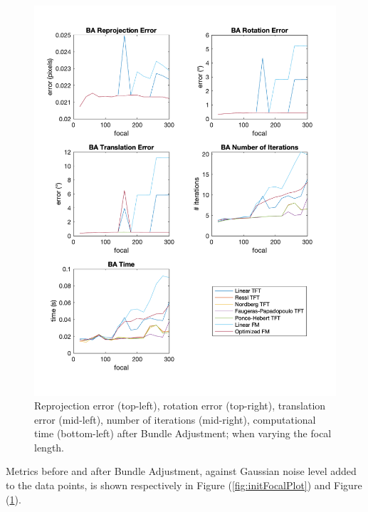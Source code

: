\begin{figure}[p]
	\centering
	\includegraphics[width=1\textwidth]{Experiments/Synthetic/focal/BAfocalPlots.png}
	\caption{Reprojection error (top-left), rotation error (top-right), translation error (mid-left), number of iterations (mid-right), computational time (bottom-left) after Bundle Adjustment; when varying the focal length.}
	\label{fig:BAFocalPlot}
\end{figure}

\pagebreak

Metrics before and after Bundle Adjustment, against Gaussian noise level added to the data points, is shown respectively in Figure (\ref{fig:initFocalPlot}) and Figure (\ref{fig:BAFocalPlot}).

